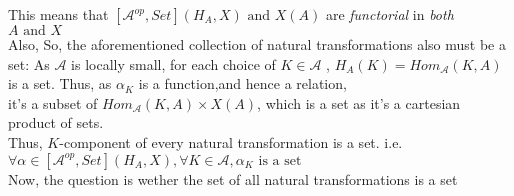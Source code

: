 \documentclass[18pt,a4paper]{extarticle}
\theoremstyle{theorem}
\theoremstyle{definition}
\theoremstyle{lemma}
\begin{document}
This means that $[ \mathcal{A}^{op},Set](H_A,X) \text{ and } X(A)$ are
\textit{functorial} in \textit{both} $A \text{ and } X$\\

Also,
So, the aforementioned collection of natural transformations also must be a set:
As $\mathcal{A} $ is locally small, for each choice of $K \in \mathcal{A} $ , $H_A(K)=Hom_{\mathcal{A}}(K,A)$ is a set.
Thus, as $\alpha_K $ is a function,and hence a relation,\\ it's a subset of $Hom_{\mathcal{A} }(K,A)\times X(A)$, which is a set as it's a cartesian product of sets.\\
Thus, $K$-component of every natural transformation is a set. i.e. $\forall \alpha \in [ \mathcal{A}^{op},Set](H_A,X), \forall K \in \mathcal{A}, \alpha_K \text{ is a set}$ \\

Now, the question is wether the set of all natural transformations is a set
\end{document}
